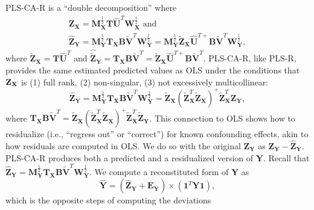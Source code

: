 \documentclass[12pt]{article}
\begin{document}
PLS-CA-R is a ``double decomposition'' where \begin{equation}
\begin{aligned}
{\mathbf Z}_{\mathbf X} = {\mathbf M}^{\frac{1}{2}}_{\mathbf X}{\mathbf T}\widehat{\mathbf U}^{T}{\mathbf W}^{\frac{1}{2}}_{\mathbf X} \text{ and }\\
\widehat{{\mathbf Z}}_{\mathbf Y} = {\mathbf M}^{\frac{1}{2}}_{\mathbf Y}{\mathbf T}_{\mathbf X}{\mathbf B}\widetilde{\mathbf V}^{T}{\mathbf W}^{\frac{1}{2}}_{\mathbf Y} = {\mathbf M}^{\frac{1}{2}}_{\mathbf Y}\widetilde{\mathbf Z}_{\mathbf X}\widehat{\mathbf U}^{{T}{+}}{\mathbf B}\widetilde{\mathbf V}^{T}{\mathbf W}^{\frac{1}{2}}_{\mathbf Y},
\label{eq:doubledecomp}
\end{aligned}
\end{equation} where
\(\widetilde{\mathbf Z}_{\mathbf X} = {\mathbf T}\widehat{\mathbf U}^{T}\)
and
\(\widehat{\widetilde{\mathbf Z}}_{\mathbf Y} = {\mathbf T}_{\mathbf X}{\mathbf B}\widetilde{\mathbf V}^{T} = \widetilde{\mathbf Z}_{\mathbf X}\widehat{\mathbf U}^{{T}{+}}{\mathbf B}\widetilde{\mathbf V}^{T}\).
PLS-CA-R, like PLS-R, provides the same estimated predicted values as
OLS under the conditions that \({\bf Z}_{\bf X}\) is (1) full rank, (2)
non-singular, (3) not excessively multicollinear: \begin{equation}
\widehat{{\mathbf Z}}_{\mathbf Y} = {\mathbf M}^{\frac{1}{2}}_{\mathbf Y}{\mathbf T}_{\mathbf X}{\mathbf B}\widetilde{\mathbf V}^{T}{\mathbf W}^{\frac{1}{2}}_{\mathbf Y} = \widetilde{\mathbf Z}_{\mathbf X} (\widetilde{\mathbf Z}_{\mathbf X}^{T}\widetilde{\mathbf Z}_{\mathbf X})^{+} \widetilde{\mathbf Z}_{\mathbf X}^T {\mathbf Z}_{\mathbf Y},
\label{ols_equivalence}
\end{equation} where
\({\mathbf T}_{\mathbf X}{\mathbf B}\widetilde{\mathbf V}^{T} = \widetilde{\mathbf Z}_{\mathbf X} (\widetilde{\mathbf Z}_{\mathbf X}^{T}\widetilde{\mathbf Z}_{\mathbf X})^{+} \widetilde{\mathbf Z}_{\mathbf X}^T\widetilde{\mathbf Z}_{\mathbf Y}\).
This connection to OLS shows how to residualize (i.e., ``regress out''
or ``correct'') for known confounding effects, akin to how residuals are
computed in OLS. We do so with the original \({\mathbf Z}_{\mathbf Y}\)
as \({\mathbf Z}_{\mathbf Y} - \widehat{\mathbf Z}_{\mathbf Y}\).
PLS-CA-R produces both a predicted and a residualized version of
\({\mathbf Y}\). Recall that
\(\widehat{{\mathbf Z}}_{\mathbf Y} = {\mathbf M}^{\frac{1}{2}}_{\mathbf Y}{\mathbf T}_{\mathbf X}{\mathbf B}\widetilde{\mathbf V}^{T}{\mathbf W}^{\frac{1}{2}}_{\mathbf Y}\).
We compute a reconstituted form of \({\mathbf Y}\) as \begin{equation}
\widehat{\mathbf Y} = (\widehat{{\mathbf Z}}_{\mathbf Y} + {\mathbf E}_{\mathbf Y}) \times ({\mathbf 1}^{T}{\mathbf Y}{\mathbf 1}),
\label{eq:Yhat}
\end{equation} which is the opposite steps of computing the deviations
\end{document}
